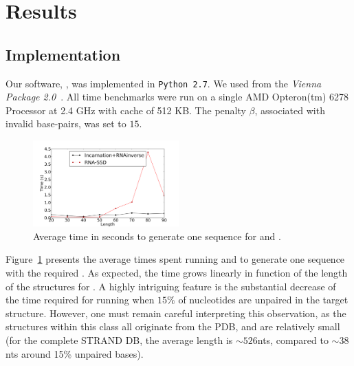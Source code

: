 \section{Results}
\label{sec:results}

\subsection{Implementation}
\label{sec:implementation}
Our software, \ourprog, was implemented in {\tt Python~2.7}. We used
\RNAinverse from the \textit{Vienna Package 2.0}~\citep{Hofacker:1994}.
All time benchmarks were run on a single AMD Opteron(tm) 6278 Processor  at 2.4 GHz with cache of 512 KB.
The penalty $\beta$, associated with invalid base-pairs, was set to $15$.

\begin{figure}[ht!]
	\centering
 	\includegraphics[width=0.5\textwidth]{Figures/time_incar_rnassd}
	\caption{
  Average time in seconds to generate one sequence for \ourprog and \RNAinverse.}
	\label{fig:time}	
\end{figure}

Figure~\ref{fig:time} presents the average times spent running \ourprog and \RNAinverse to generate one sequence
with the required \GCContent. As expected, the time grows linearly
in function of the length of the structures for \ourprog.  A highly intriguing feature is the substantial decrease of the time 
required for running \RNAinverse when $15\%$ of nucleotides are unpaired in the target structure.
However, one must remain careful interpreting this observation, as the structures within this class all originate from the PDB, and are relatively small (for the complete STRAND DB, the average length is $\sim526$nts, compared to $\sim38$nts around 15\% unpaired bases).



